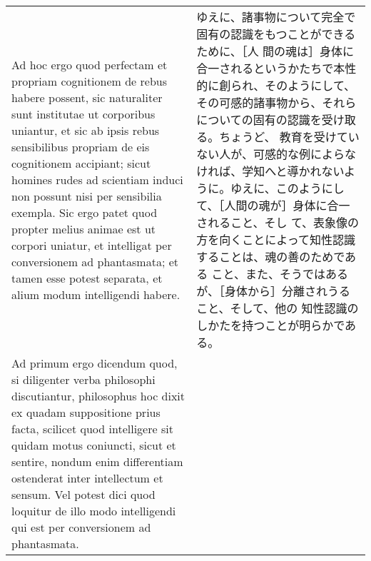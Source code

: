 \documentclass[10pt]{jsarticle} %
\begin{document}
\begin{longtable}{p{21em}p{21em}}
Ad hoc ergo quod perfectam et propriam cognitionem de rebus habere
possent, sic naturaliter sunt institutae ut corporibus uniantur, et
sic ab ipsis rebus sensibilibus propriam de eis cognitionem accipiant;
sicut homines rudes
ad scientiam induci non possunt nisi per sensibilia exempla. Sic ergo
patet quod propter melius animae est ut corpori uniatur, et intelligat
per conversionem ad phantasmata; et tamen esse potest separata, et
alium modum intelligendi habere.


&ゆえに、諸事物について完全で固有の認識をもつことができるために、［人
間の魂は］身体に合一されるというかたちで本性的に創られ、そのようにして、
その可感的諸事物から、それらについての固有の認識を受け取る。ちょうど、
教育を受けていない人が、可感的な例によらなければ、学知へと導かれないよ
うに。ゆえに、このようにして、［人間の魂が］身体に合一されること、そし
て、表象像の方を向くことによって知性認識することは、魂の善のためである
こと、また、そうではあるが、［身体から］分離されうること、そして、他の
知性認識のしかたを持つことが明らかである。


\\



Ad primum ergo dicendum quod, si diligenter verba philosophi
discutiantur,
philosophus hoc dixit ex quadam suppositione prius facta, scilicet
quod intelligere sit quidam motus coniuncti, sicut et sentire, nondum
enim differentiam ostenderat inter intellectum et sensum. Vel potest
dici quod loquitur de illo modo intelligendi qui est per conversionem
ad phantasmata.


\end{longtable}
\end{document}
